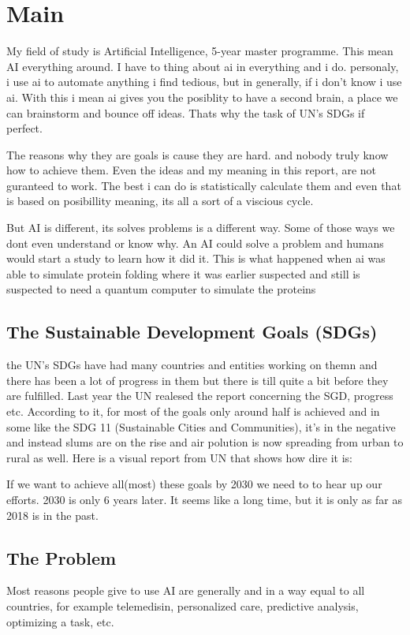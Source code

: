 \chapter{Main}
My field of study is Artificial Intelligence, 5-year master programme. This mean AI everything around. I have to thing about ai in everything and i do. personaly, i use ai to automate anything i find tedious, but in generally, if i don't know i use ai. With this i mean ai gives you the posiblity to have a second brain, a place we can brainstorm and bounce off ideas. Thats why the task of UN's SDGs if perfect. 

The reasons why they are goals is cause they are hard. and nobody truly know how to achieve them. Even the ideas and my meaning in this report, are not guranteed to work. The best i can do is statistically calculate them and even that is based on posibillity meaning, its all a sort of a viscious cycle.

But AI is different, its solves problems is a different way. Some of those ways we dont even understand or know why. An AI could solve a problem and humans would start a study to learn how it did it. This is what happened when ai was able to simulate protein folding\cite{protein-folding} where it was earlier suspected and still is suspected to need a  quantum computer to simulate the proteins\cite{Hu2023Quantum}

\section{The Sustainable Development Goals (SDGs)}
the UN's SDGs have had many countries and entities working on themn and there has been a lot of progress in them but there is till quite a bit before they are fulfilled. 
Last year the UN realesed the report concerning the SGD, progress etc\cite{sgds-progress}. According to it, for most of the goals only around half is achieved and in some like the SDG 11 (Sustainable Cities and Communities), it's in the negative and instead slums are on the rise and air polution is now spreading from urban to rural as well. Here is a visual report from UN that shows how dire it is: \cite{sgds-progress}

If we want to achieve all(most) these goals by 2030 we need to to hear up our efforts. 2030 is only 6 years later. It seems like a long time, but it is only as far as 2018 is in the past.

\section{The Problem}
Most reasons people give to use AI are generally and in a way equal to all countries, for example telemedisin, personalized care, predictive analysis, optimizing a task, etc.

